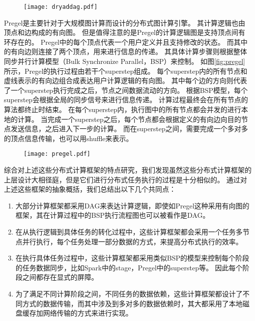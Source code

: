 \begin{figure}[!htp]
    \centering
    \texttt{[image: dryaddag.pdf]}
\end{figure}

Pregel\cite{pregel}是主要针对于大规模图计算而设计的分布式图计算引擎。
其计算逻辑也由顶点和边构成的有向图。
但是值得注意的是Pregel的计算逻辑图是支持顶点间有环存在的。
Pregel中的每个顶点代表一个用户定义并且支持修改的状态。
而其中的有向边则连接了两个顶点，用来进行信息的传递。
其具体计算步骤则根据整体同步并行计算模型（Bulk Synchronize Parallel，BSP）来控制。
如图\ref{fig:pregel}所示，Pregel的执行过程由若干个superstep组成。
每个superstep内的所有节点和虚线表示的有向边组合成表达用户计算逻辑的有向图。
其中每个边的方向则代表了一个superstep执行完成之后，节点之间数据流动的方向。
根据BSP模型，每个superstep会根据全局的同步信号来进行信息传递。
计算过程最终会在所有节点的算法都终止时结束。
在每个superstep内，执行图中的所有节点都会并发的进行本地的计算。
当完成一个superstep之后，每个节点都会根据定义的有向边向目的节点发送信息，之后进入下一步的计算。
而在superstep之间，需要完成一个多对多的顶点信息传输，也可以用shuffle来表示。

\begin{figure}[!htp]
    \centering
    \texttt{[image: pregel.pdf]}
\end{figure}

综合对上述这些分布式计算框架的特点研究，我们发现虽然这些分布式计算框架的上层设计大相径庭，但是它们进行分布式任务执行的过程是十分相似的。
通过对上述这些框架的抽象概括，我们总结出以下几个共同点：

\begin{enumerate}
	\item 大部分计算框架都采用DAG来表达计算逻辑，即使如Pregel这种采用有向图的框架，其在计算过程中的BSP执行流程图也可以被看作是DAG。
	\item 在从执行逻辑到具体任务的转化过程中，这些计算框架都会采用一个任务多节点并行执行，每个任务处理一部分数据的方式，来提高分布式执行的效率。
	\item 在执行具体任务过程中，这些计算框架都采用类似BSP的模型来控制每个阶段的任务数据同步，比如Spark中的stage，Pregel中的superstep等。
	因此每个阶段之间都存在显式的屏障。
	\item 为了满足不同计算阶段之间，不同任务的数据依赖，这些计算框架都设计了不同方式的数据传输，而其中涉及到多对多的数据依赖时，其大都采用了本地磁盘缓存加网络传输的方式来进行实现。 
\end{enumerate}

